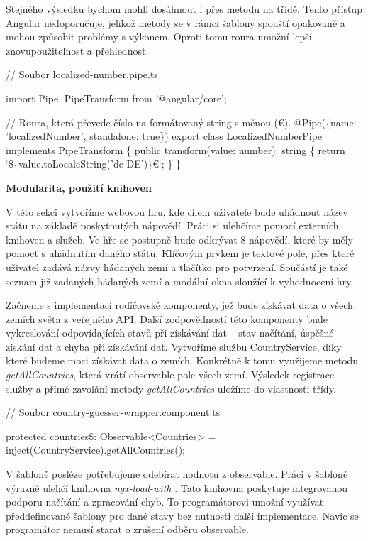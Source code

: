 Stejného výsledku bychom mohli dosáhnout i přes metodu na třídě. Tento přístup Angular nedoporučuje, jelikož metody se v rámci šablony spouští opakovaně a mohou způsobit problémy s výkonem. 
Oproti tomu roura umožní lepší znovupoužitelnost a přehlednost.

\begin{prog}
// Soubor localized-number.pipe.ts

import {Pipe, PipeTransform} from '@angular/core';

// Roura, která převede číslo na formátovaný string s měnou (€).
@Pipe(\{name: 'localizedNumber', standalone: true\})
export class LocalizedNumberPipe implements PipeTransform \{
  public transform(value: number): string \{
    return `\$\{value.toLocaleString('de-DE')\}€`;
  \}
\}
\end{prog}

\begin{flushleft}
  \textbf{Modularita, použití knihoven}
\end{flushleft}

V této sekci vytvoříme webovou hru, kde cílem uživatele bude uhádnout název státu na základě poskytnutých nápovědí. Práci si ulehčíme pomocí externích knihoven a služeb.
Ve hře se postupně bude odkrývat 8 nápovědí, které by měly pomoct s uhádnutím daného státu. 
Klíčovým prvkem je textové pole, přes které uživatel zadává názvy hádaných zemí a tlačítko pro potvrzení. 
Součástí je také seznam již zadaných hádaných zemí a modální okna sloužící k vyhodnocení hry.

Začneme s implementací rodičovské komponenty, jež bude získávat data o všech zemích světa z veřejného API. 
Další zodpovědností této komponenty bude vykreslování odpovídajících stavů při získávání dat -- stav načítání, úspěšné získání dat a chyba při získávání dat. 
Vytvoříme službu CountryService, díky které budeme moci získávat data o zemích. Konkrétně k tomu využijeme metodu \emph{getAllCountries}, která vrátí observable pole všech zemí. 
Výsledek registrace služby a přímé zavolání metody \emph{getAllCountries} uložíme do vlastnosti třídy.

\begin{prog}
// Soubor country-guesser-wrapper.component.ts

protected countries\$: Observable<Countries> 
  = inject(CountryService).getAllCountries();
\end{prog}

V šabloně posléze potřebujeme odebírat hodnotu z observable. Práci v šabloně výrazně ulehčí knihovna \emph{ngx-load-with} \cite{ngxloadwith}. 
Tato knihovna poskytuje integrovanou podporu načítání a zpracování chyb. To programátorovi umožní využívat předdefinované šablony pro dané stavy bez nutnosti další implementace. 
Navíc se programátor nemusí starat o zrušení odběru observable.


